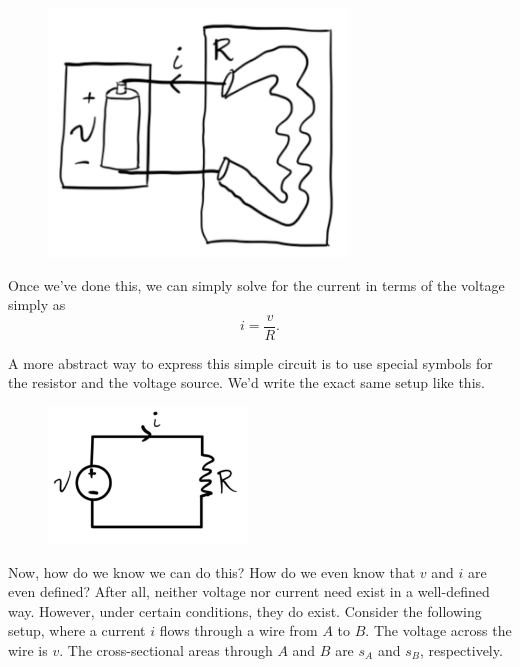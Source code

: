 \documentclass[
  letterpaper,
  DIV=11,
  numbers=noendperiod]{scrreprt}
\begin{document}
\begin{figure}

{\centering \includegraphics[width=3.125in,height=\textheight]{circuits/./resources/image-20230212053637354.png}

}

\end{figure}

Once we've done this, we can simply solve for the current in terms of
the voltage simply as \[i = \frac{v}{R}.\]

A more abstract way to express this simple circuit is to use special
symbols for the resistor and the voltage source. We'd write the exact
same setup like this.

\begin{figure}

{\centering \includegraphics[width=2.08333in,height=\textheight]{circuits/./resources/image-20230212053848916.png}

}

\end{figure}

Now, how do we know we can do this? How do we even know that \(v\) and
\(i\) are even defined? After all, neither voltage nor current need
exist in a well-defined way. However, under certain conditions, they do
exist. Consider the following setup, where a current \(i\) flows through
a wire from \(A\) to \(B\). The voltage across the wire is \(v\). The
cross-sectional areas through \(A\) and \(B\) are \(s_A\) and \(s_B\),
respectively.
\end{document}
